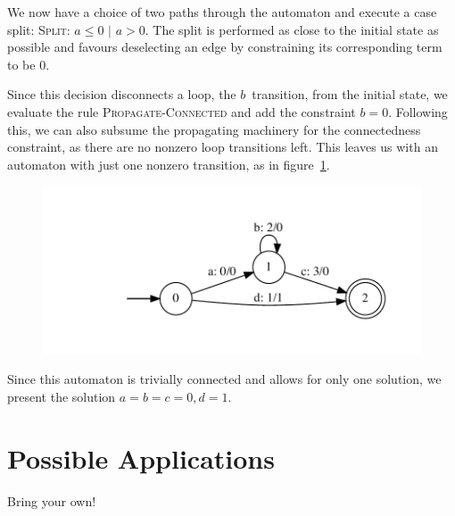 \documentclass[runningheads]{llncs}
\begin{document}
We now have a choice of two paths through the automaton and execute a case split: \textsc{Split}: $a \leq 0$ $\mid$ $a > 0$. The split is performed as close to the initial state as possible and favours deselecting an edge by constraining its corresponding term to be 0.

Since this decision disconnects a loop, the $b$~transition, from the initial state, we evaluate the rule \textsc{Propagate-Connected} and add the constraint $b = 0$. Following this, we can also subsume the propagating machinery for the connectedness constraint, as there are no nonzero loop transitions left. This leaves us with an automaton with just one nonzero transition, as in figure~\ref{fig:final}.

\begin{figure}[h]
  \centering
  \label{fig:final}
  \includegraphics[width=\textwidth]{trace-3-aut-0}
  \end{figure}
  

Since this automaton is trivially connected and allows for only one solution, we
present the solution $a = b = c = 0, d=1$.

\section{Possible Applications}
Bring your own!


%
\printbibliography
\end{document}
